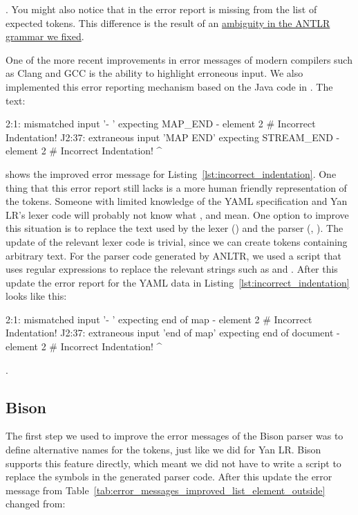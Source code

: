 . You might also notice that in the error report  is missing from the list of expected tokens. This difference is the result of an \href{https://github.com/ElektraInitiative/libelektra/commit/0fe4953}{ambiguity in the ANTLR grammar we fixed}.

One of the more recent improvements in error messages of modern compilers such as Clang and GCC is the ability to highlight erroneous input. We also implemented this error reporting mechanism based on the Java code in . The text:

\begin{textcode}
2:1: mismatched input '- ' expecting MAP_END
     - element 2 # Incorrect Indentation!
     ^^
2:37: extraneous input 'MAP END' expecting STREAM_END
      - element 2 # Incorrect Indentation!
                                          ^
\end{textcode}

shows the improved error message for Listing~\ref{lst:incorrect_indentation}. One thing that this error report still lacks is a more human friendly representation of the tokens. Someone with limited knowledge of the YAML specification and Yan LR’s lexer code will probably not know what ,  and  mean. One option to improve this situation is to replace the text used by the lexer () and the parser (, ). The update of the relevant lexer code is trivial, since we can create tokens containing arbitrary text. For the parser code generated by ANLTR, we used a script that uses regular expressions to replace the relevant strings such as  and . After this update the error report for the YAML data in Listing~\ref{lst:incorrect_indentation} looks like this:

\begin{textcode}
2:1: mismatched input '- ' expecting end of map
     - element 2 # Incorrect Indentation!
     ^^
2:37: extraneous input 'end of map' expecting end of document
      - element 2 # Incorrect Indentation!
                                          ^
\end{textcode}

.

\subsection{Bison}

The first step we used to improve the error messages of the Bison parser was to define alternative names for the tokens, just like we did for Yan LR. Bison supports this feature directly, which meant we did not have to write a script to replace the symbols in the generated parser code. After this update the error message from Table~\ref{tab:error_messages_improved_list_element_outside} changed from:

